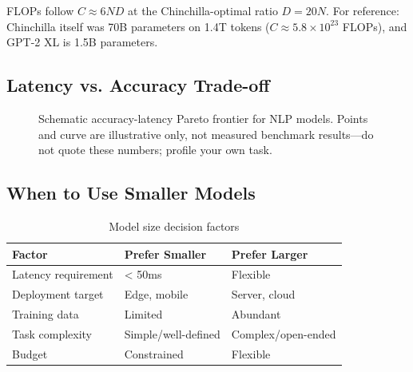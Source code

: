 FLOPs follow $C \approx 6ND$ at the Chinchilla-optimal ratio $D = 20N$. For reference: Chinchilla itself was 70B parameters on 1.4T tokens ($C \approx 5.8 \times 10^{23}$ FLOPs), and GPT-2 XL is 1.5B parameters.

\subsection{Latency vs. Accuracy Trade-off}

\begin{figure}[H]
\centering
{}
\caption{Schematic accuracy-latency Pareto frontier for NLP models. Points and curve are illustrative only, not measured benchmark results---do not quote these numbers; profile your own task.}
\end{figure}

\subsection{When to Use Smaller Models}

\begin{table}[H]
\centering
\caption{Model size decision factors}
\begin{tabularx}{\textwidth}{lXX}
\toprule
\textbf{Factor} & \textbf{Prefer Smaller} & \textbf{Prefer Larger} \\
\midrule
Latency requirement & < 50ms & Flexible \\
Deployment target & Edge, mobile & Server, cloud \\
Training data & Limited & Abundant \\
Task complexity & Simple/well-defined & Complex/open-ended \\
Budget & Constrained & Flexible \\
\bottomrule
\end{tabularx}
\end{table}

